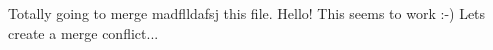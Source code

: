 Totally going to merge madflldafsj this file.
Hello!
This seems to work :-)
Lets create a merge conflict...
